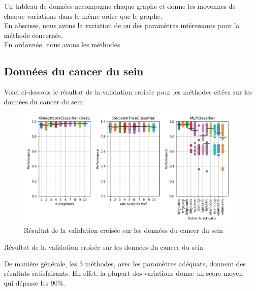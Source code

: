 \documentclass[11pt, a4paper]{article}
\begin{document}
Un tableau de données accompagne chaque graphe et donne les moyennes de chaque variations dans le même ordre que le graphe. \\
En abscisse, nous avons la variation de ou des paramètres intéressants pour la méthode concernée. \\
En ordonnée, nous avons les méthodes.

\newpage

\subsection{Données du cancer du sein}

Voici ci-dessous le résultat de la validation croisée pour les méthodes citées sur les données du cancer du sein:

\begin{figure}[H]
    \begin{center}
        \includegraphics[width=1\textwidth]{ex2_breastcancer}
    \end{center}
    \caption{Résultat de la validation croisée sur les données du cancer du sein}
    \label{Résultat de la validation croisée sur les données du cancer du sein}
\end{figure}

\begin{table}[H]
    \begin{center}
    \end{center}
    \caption{Résultat de la validation croisée sur les données du cancer du sein}
    \label{Résultat de la validation croisée sur les données du cancer du sein}
\end{table}

De manière générale, les 3 méthodes, avec les paramètres adéquats, donnent des résultats satisfaisants.
En effet, la plupart des variations donne un score moyen qui dépasse les 90\%. \\
\end{document}
